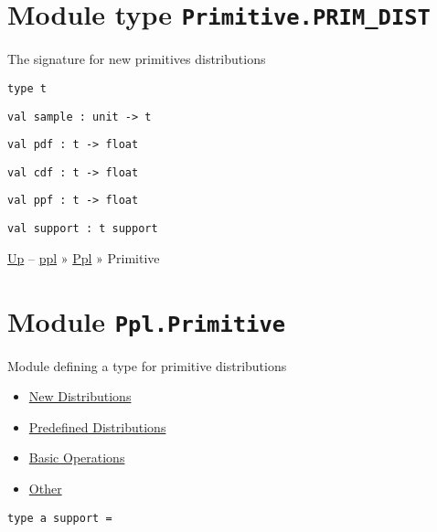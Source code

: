 \section{\texorpdfstring{Module type
\texttt{Primitive.PRIM\_DIST}}{Module type Primitive.PRIM\_DIST}}\label{module-type-primitive.primux5fdist}

The signature for new primitives distributions

\protect\hyperlink{type-t}{}\texttt{type\ t}

\protect\hyperlink{val-sample}{}\texttt{val\ sample\ :\ unit\ -\textgreater{}\ t}

\protect\hyperlink{val-pdf}{}\texttt{val\ pdf\ :\ t\ -\textgreater{}\ float}

\protect\hyperlink{val-cdf}{}\texttt{val\ cdf\ :\ t\ -\textgreater{}\ float}

\protect\hyperlink{val-ppf}{}\texttt{val\ ppf\ :\ t\ -\textgreater{}\ float}

\protect\hyperlink{val-support}{}\texttt{val\ support\ :\ t\ support}

\href{../index.html}{Up} -- \href{../../index.html}{ppl} »
\href{../index.html}{Ppl} » Primitive

\section{\texorpdfstring{Module
\texttt{Ppl.Primitive}}{Module Ppl.Primitive}}\label{module-ppl.primitive}

Module defining a type for primitive distributions

\begin{itemize}
\tightlist
\item
  \protect\hyperlink{newux5fprim}{New Distributions}
\item
  \protect\hyperlink{inbuiltux5fdists}{Predefined Distributions}
\item
  \protect\hyperlink{basicux5fops}{Basic Operations}
\item
  \protect\hyperlink{primux5fother}{Other}
\end{itemize}

\protect\hyperlink{type-support}{}\texttt{type\ \textquotesingle{}a\ support}\texttt{\ =\ }


